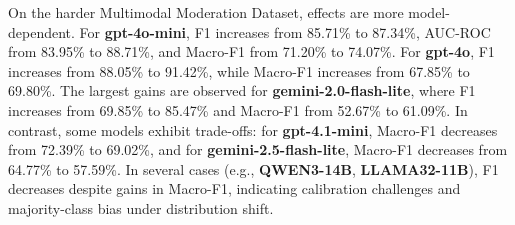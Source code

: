 On the harder Multimodal Moderation Dataset, effects are more model-dependent. For \textbf{gpt-4o-mini}, F1 increases from 85.71\% to 87.34\%, AUC-ROC from 83.95\% to 88.71\%, and Macro-F1 from 71.20\% to 74.07\%. For \textbf{gpt-4o}, F1 increases from 88.05\% to 91.42\%, while Macro-F1 increases from 67.85\% to 69.80\%. The largest gains are observed for \textbf{gemini-2.0-flash-lite}, where F1 increases from 69.85\% to 85.47\% and Macro-F1 from 52.67\% to 61.09\%. In contrast, some models exhibit trade-offs: for \textbf{gpt-4.1-mini}, Macro-F1 decreases from 72.39\% to 69.02\%, and for \textbf{gemini-2.5-flash-lite}, Macro-F1 decreases from 64.77\% to 57.59\%. In several cases (e.g., \textbf{QWEN3-14B}, \textbf{LLAMA32-11B}), F1 decreases despite gains in Macro-F1, indicating calibration challenges and majority-class bias under distribution shift.

